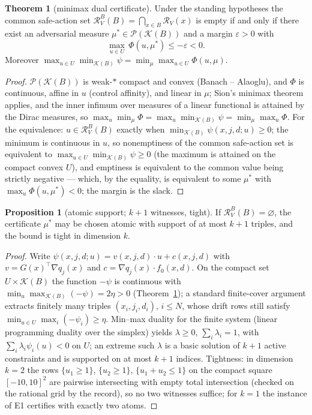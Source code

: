 \documentclass[10pt,twocolumn]{article}
\theoremstyle{definition}
\newtheorem{theorem}{Theorem}
\newtheorem{proposition}{Proposition}
\begin{document}
\begin{theorem}[minimax dual certificate]\label{thm:dual}
Under the standing hypotheses the common safe-action set
$\mathcal{R}^{B}_{V}(B) = \bigcap_{x \in B}\mathcal{R}_{V}(x)$ is empty if
and only if there exist an adversarial measure
$\mu^{*} \in \mathscr{P}(\mathcal{K}(B))$ and a margin $\varepsilon > 0$
with
\begin{equation*}
\max_{u \in U}\,\Phi(u,\mu^{*}) \le -\varepsilon < 0.
\tag{$\star$}
\end{equation*}
Moreover
$\max_{u \in U}\min_{\mathcal{K}(B)}\psi
 = \min_{\mu}\max_{u \in U}\Phi(u,\mu)$.
\end{theorem}
\begin{proof}
$\mathscr{P}(\mathcal{K}(B))$ is weak-$*$ compact and convex (Banach --
Alaoglu), and $\Phi$ is continuous, affine in $u$ (control affinity), and
linear in $\mu$; Sion's minimax theorem applies, and the inner infimum
over measures of a linear functional is attained by the Dirac measures,
so
$\max_{u}\min_{\mu}\Phi = \max_{u}\min_{\mathcal{K}(B)}\psi
 = \min_{\mu}\max_{u}\Phi$.
For the equivalence: $u \in \mathcal{R}^{B}_{V}(B)$ exactly when
$\min_{\mathcal{K}(B)}\psi(x,j,d;u) \ge 0$; the minimum is continuous in
$u$, so nonemptiness of the common safe-action set is equivalent to
$\max_{u \in U}\min_{\mathcal{K}(B)}\psi \ge 0$ (the maximum is attained
on the compact convex $U$), and emptiness is equivalent to the common
value being strictly negative --- which, by the equality, is equivalent to
some $\mu^{*}$ with $\max_{u}\Phi(u,\mu^{*}) < 0$; the margin is the
slack.
\end{proof}

\begin{proposition}[atomic support; $k+1$ witnesses, tight]
\label{prop:sparse}
If $\mathcal{R}^{B}_{V}(B) = \varnothing$, the certificate $\mu^{*}$ may
be chosen atomic with support of at most $k+1$ triples, and the bound is
tight in dimension $k$.
\end{proposition}
\begin{proof}
Write $\psi(x,j,d;u) = v(x,j,d)\cdot u + c(x,j,d)$ with
$v = G(x)^{\top}\nabla q_{j}(x)$ and $c = \nabla q_{j}(x)\cdot f_{0}(x,d)$.
On the compact set $U \times \mathcal{K}(B)$ the function $-\psi$ is
continuous with
$\min_{u}\max_{\mathcal{K}(B)}(-\psi) = 2\eta > 0$ (Theorem~\ref{thm:dual});
a standard finite-cover argument extracts finitely many triples
$(x_{i},j_{i},d_{i})$, $i \le N$, whose drift rows still satisfy
$\min_{u \in U}\max_{i}(-\psi_{i}) \ge \eta$. Min--max duality for the
finite system (linear programming duality over the simplex) yields
$\lambda \ge 0$, $\sum_{i}\lambda_{i} = 1$, with
$\sum_{i}\lambda_{i}\psi_{i}(u) < 0$ on $U$; an extreme such
$\lambda$ is a basic solution of $k+1$ active constraints and is supported
on at most $k+1$ indices. Tightness: in dimension $k = 2$ the rows
$\{u_{1} \ge 1\}$, $\{u_{2} \ge 1\}$, $\{u_{1}+u_{2} \le 1\}$ on the
compact square $[-10,10]^{2}$ are pairwise intersecting with empty total
intersection (checked on the rational grid by the record), so no two
witnesses suffice; for $k = 1$ the instance of E1 certifies with exactly
two atoms.
\end{proof}
\end{document}
